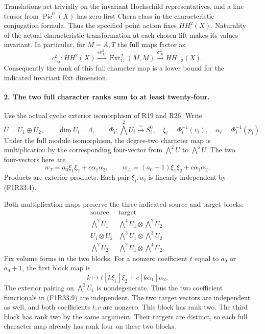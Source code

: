Translations act trivially on the invariant
Hochschild representatives, and a line tensor
from $\operatorname{Pic}^0(X)$ has zero first
Chern class in the characteristic conjugation
formula. Thus the specified point action
fixes $HH^2(X)$. Naturality of the actual
characteristic transformation at each chosen
lift makes its values invariant. In particular,
for $M=A,T$ the full maps factor as
\[
 c_{z_M}^2:
 HH^2(X)\xrightarrow{\operatorname{ev}_M^2}
       \operatorname{Ext}^2_G(M,M)
       \xrightarrow{\sigma_M^2}HH_{-2}(X).
 \tag{F1R33.5}
\]
Consequently the rank of this full
character map is a lower bound for the
indicated invariant Ext dimension.

\paragraph{2. The two full character ranks sum to at least twenty-four.}
Use the actual cyclic exterior isomorphism
of R19 and R26. Write
\[
 U=U_1\oplus U_2,\qquad \dim U_i=4,\qquad
 \Phi_i:\bigwedge^2U_i\xrightarrow{\sim}S_i^0,
 \quad \xi_i=\Phi_i^{-1}(v_i),\quad
 \alpha_i=\Phi_i^{-1}(p_i).
 \tag{F1R33.6}
\]
Under the full module isomorphism, the
degree-two character map is multiplication
by the corresponding four-vector from
$\bigwedge^2U$ to $\bigwedge^6U$.
The two four-vectors here are
\[
 w_T=a_0\xi_1\xi_2+c\alpha_1\alpha_2,
 \qquad
 w_A=(a_0+1)\xi_1\xi_2+c\alpha_1\alpha_2.
 \tag{F1R33.7}
\]
Products are exterior products. Each pair
$\xi_i,\alpha_i$ is linearly independent
by (F1R33.4).

Both multiplication maps preserve the
three indicated source and target blocks:
\[
 \begin{array}{c|c}
 \text{source}&\text{target}\\ \hline
 \bigwedge^2U_1&\bigwedge^4U_1\otimes\bigwedge^2U_2\\
 U_1\otimes U_2&\bigwedge^3U_1\otimes\bigwedge^3U_2\\
 \bigwedge^2U_2&\bigwedge^2U_1\otimes\bigwedge^4U_2.
 \end{array}
 \tag{F1R33.8}
\]
Fix volume forms in the two blocks.
For a nonzero coefficient $t$ equal to
$a_0$ or $a_0+1$, the first block map is
\[
 k\longmapsto t[k\xi_1]\xi_2+c[k\alpha_1]\alpha_2.
 \tag{F1R33.9}
\]
The exterior pairing on $\bigwedge^2U_1$
is nondegenerate. Thus the two coefficient
functionals in (F1R33.9) are independent.
The two target vectors are independent
as well, and both coefficients $t,c$ are
nonzero. This block has rank two.
The third block has rank two by the same
argument. Their targets are distinct,
so each full character map already has
rank four on these two blocks.

